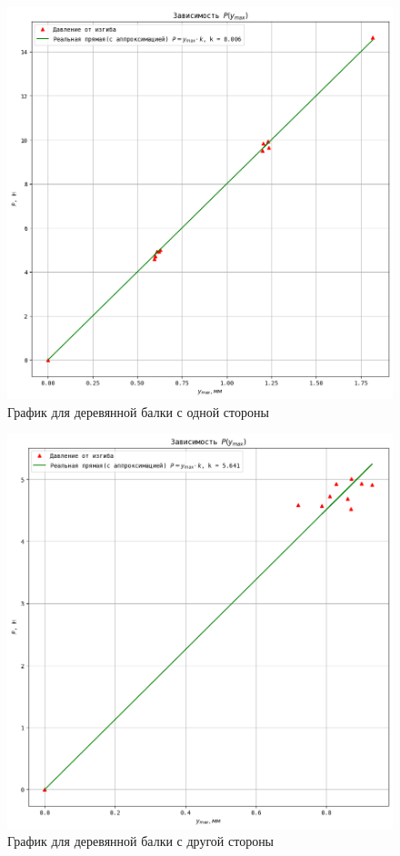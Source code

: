 \documentclass[a4paper]{article}
\begin{document}
\begin{figure}[p]
    \centering
    \includegraphics[scale=0.8]{graphic1.png}
    \caption{График для деревянной балки с одной стороны}
\end{figure}

\begin{figure}[p]
    \centering
    \includegraphics[scale=0.8]{graphic2.png}
    \caption{График для деревянной балки с другой стороны}
\end{figure}
\end{document}
